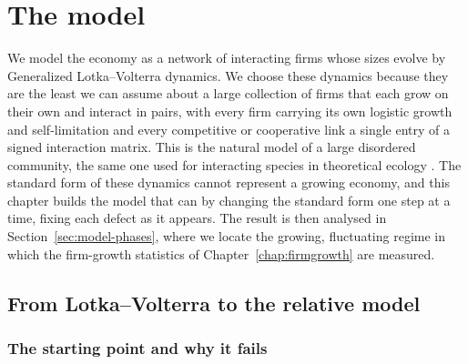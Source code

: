 \chapter{The model}
\label{chap:growing}

We model the economy as a network of interacting firms whose sizes evolve by Generalized
Lotka--Volterra dynamics. We choose these dynamics because they are the least we can assume about
a large collection of firms that each grow on their own and interact in pairs, with every firm
carrying its own logistic growth and self-limitation and every competitive or cooperative link a
single entry of a signed interaction matrix. This is the natural model of a large disordered
community, the same one used for interacting species in theoretical ecology \citep{may1972}. The standard form of these dynamics cannot represent
a growing economy, and this chapter builds the model that can by changing the standard form one
step at a time, fixing each defect as it appears. The result is then analysed in
Section~\ref{sec:model-phases}, where we locate the growing, fluctuating regime in which the
firm-growth statistics of Chapter~\ref{chap:firmgrowth} are measured.

\section{From Lotka--Volterra to the relative model}
\label{sec:relative-model}

\subsection{The starting point and why it fails}
\label{sec:starting-point}

